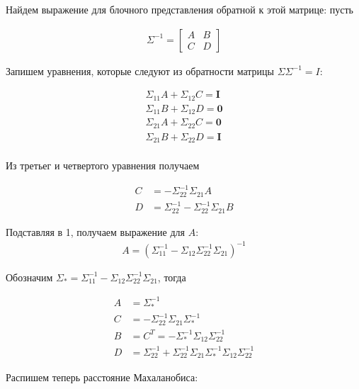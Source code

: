 \documentclass[fleqn]{article}
\numberwithin{equation}{section}
\numberwithin{theorem}{section}
\numberwithin{figure}{section}
\numberwithin{lemma}{section}
\numberwithin{corollary}{section}
\begin{document}
Найдем выражение для блочного представления обратной к этой матрице: пусть 

\begin{align}
	\Sigma^{-1} = \begin{bmatrix}
		A       & B \\
		C       &D
	\end{bmatrix}
\end{align}

Запишем уравнения, которые следуют из обратности матрицы $\Sigma \Sigma^{-1} = I$:

\begin{align}
	\Sigma_{11}A + \Sigma_{12}C = \mathbf{I}\\
	\Sigma_{11}B + \Sigma_{12}D = \mathbf{0}\\
	\Sigma_{21}A + \Sigma_{22}C = \mathbf{0}\\
	\Sigma_{21}B + \Sigma_{22}D = \mathbf{I}\\
\end{align}

Из третьег и четвертого уравнения получаем

\begin{align}
	C &= -\Sigma_{22}^{-1}\Sigma_{21}A\\
	D &= \Sigma_{22}^{-1} - \Sigma_{22}^{-1} \Sigma_{21}B
\end{align}

Подставляя в 1, получаем выражение для $A$:
\begin{align}
	A = (\Sigma_{11}^{-1} - \Sigma_{12}\Sigma_{22}^{-1}\Sigma_{21})^{-1}
\end{align}

Обозначим $\Sigma_{*} = \Sigma_{11}^{-1} - \Sigma_{12}\Sigma_{22}^{-1}\Sigma_{21}$, тогда 

\begin{align}
	A &= \Sigma_*^{-1}\\
	C &= -\Sigma_{22}^{-1}\Sigma_{21}\Sigma_*^{-1}\\
	B &= C^{T} = -\Sigma_*^{-1}\Sigma_{12}\Sigma_{22}^{-1}\\
	D &= \Sigma_{22}^{-1} + \Sigma_{22}^{-1} \Sigma_{21}\Sigma_*^{-1}\Sigma_{12}\Sigma_{22}^{-1}
\end{align}

Распишем теперь расстояние Махаланобиса:
\end{document}
